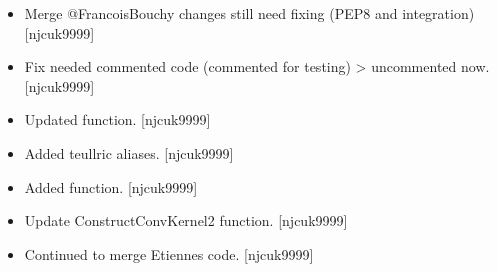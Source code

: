 \documentclass[a4paper,10pt,english]{report}
\begin{document}
\begin{itemize}
\item {} 
Merge @FrancoisBouchy changes \sphinxhyphen{} still need fixing (PEP8 and
integration) {[}njcuk9999{]}

\item {} 
Fix needed commented code (commented for testing) \textendash{}\textgreater{} uncommented now.
{[}njcuk9999{]}

\item {} 
Updated  function. {[}njcuk9999{]}

\item {} 
Added teullric aliases. {[}njcuk9999{]}

\item {} 
Added  function. {[}njcuk9999{]}

\item {} 
Update ConstructConvKernel2 function. {[}njcuk9999{]}

\item {} 
Continued to merge Etiennes code. {[}njcuk9999{]}

\end{itemize}
\end{document}
